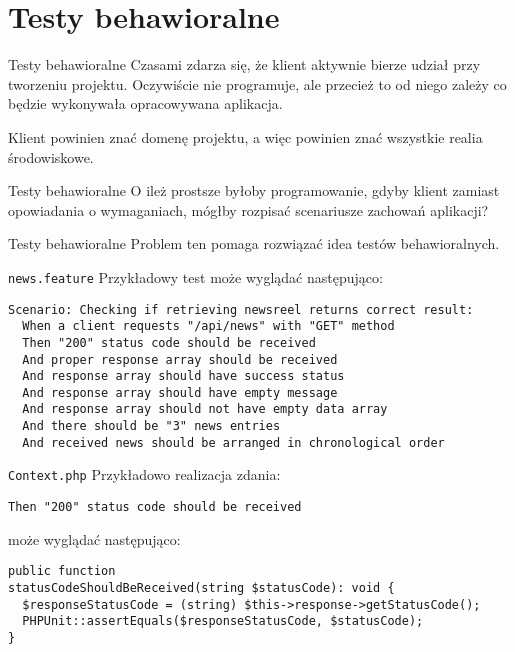 \section{Testy behawioralne}

\begin{frame}{Testy behawioralne}
	Czasami zdarza się, że klient aktywnie bierze udział przy tworzeniu projektu. Oczywiście nie programuje, ale przecież to od niego zależy co będzie wykonywała opracowywana aplikacja.
	
	Klient powinien znać domenę projektu, a więc powinien znać wszystkie realia środowiskowe.
\end{frame}

\begin{frame}{Testy behawioralne}
	O ileż prostsze byłoby programowanie, gdyby klient zamiast opowiadania o wymaganiach, mógłby rozpisać scenariusze zachowań aplikacji?
\end{frame}

\begin{frame}{Testy behawioralne}
	Problem ten pomaga rozwiązać idea testów behawioralnych.
\end{frame}

\begin{frame}[fragile]{\texttt{news.feature}}	
	Przykładowy test może wyglądać następująco:
	
\begin{lstlisting}
Scenario: Checking if retrieving newsreel returns correct result:
  When a client requests "/api/news" with "GET" method
  Then "200" status code should be received
  And proper response array should be received
  And response array should have success status
  And response array should have empty message
  And response array should not have empty data array
  And there should be "3" news entries
  And received news should be arranged in chronological order
\end{lstlisting}
\end{frame}

\begin{frame}[fragile]{\texttt{Context.php}}	
	Przykładowo realizacja zdania:
	
\begin{lstlisting}
Then "200" status code should be received
\end{lstlisting}

	może wyglądać następująco:
	
\begin{lstlisting}
public function
statusCodeShouldBeReceived(string $statusCode): void {
  $responseStatusCode = (string) $this->response->getStatusCode();
  PHPUnit::assertEquals($responseStatusCode, $statusCode);
}
\end{lstlisting}
\end{frame}

